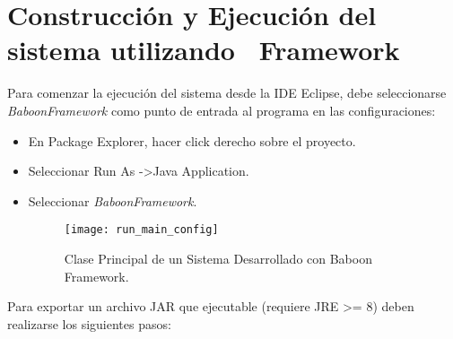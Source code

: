 \section {Construcción y Ejecución del sistema utilizando \nombreFramework \
Framework}

Para comenzar la ejecución del sistema desde la IDE Eclipse, debe seleccionarse
\emph{BaboonFramework} como punto de entrada al programa en las configuraciones:
    \begin{itemize}
      \item En Package Explorer, hacer click derecho sobre el proyecto.
      \item Seleccionar Run As -\textgreater Java Application.
      \item Seleccionar \emph{BaboonFramework}.
      \begin{figure}[H]
            \centering
            \texttt{[image: run\_main\_config]}
            \caption{Clase Principal de un Sistema Desarrollado con Baboon Framework.}
            \label{fig:baboon_main}
      \end{figure}
    \end{itemize}

Para exportar un archivo JAR que ejecutable (requiere JRE \textgreater= 8) deben
realizarse los siguientes pasos:

